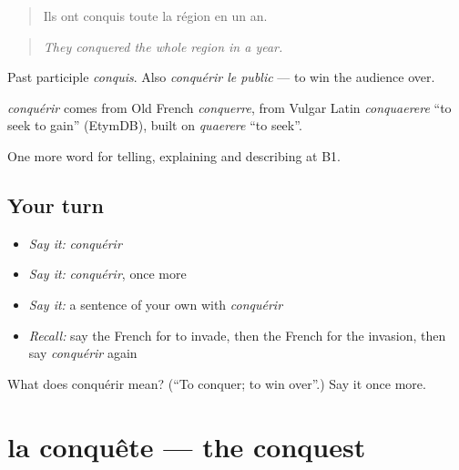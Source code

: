 \begin{quote}
Ils ont conquis toute la région en un an.
\end{quote}

\begin{quote}
\emph{They conquered the whole region in a year.}
\end{quote}

Past participle \emph{conquis}. Also \emph{conquérir le public} — to win the audience over.

\begin{cousinweb}
\emph{conquérir} comes from Old French \emph{conquerre}, from Vulgar Latin \emph{conquaerere} \textquotedblleft{}to seek to gain\textquotedblright{} (EtymDB), built on \emph{quaerere} \textquotedblleft{}to seek\textquotedblright{}.
\end{cousinweb}

\begin{grammarlens}[title={What you've built}]
One more word for telling, explaining and describing at B1.
\end{grammarlens}

\subsection*{Your turn}
\begin{itemize}
\raggedright
  \item \emph{Say it:} \emph{conquérir}
  \item \emph{Say it:} \emph{conquérir}, once more
  \item \emph{Say it:} a sentence of your own with \emph{conquérir}
  \item \emph{Recall:} say the French for to invade, then the French for the invasion, then say \emph{conquérir} again
\end{itemize}

\begin{tcolorbox}[breakable,colback=teal!4,colframe=teal!35!black,title={Before you move on}]
What does conquérir mean? (\textquotedblleft{}To conquer; to win over\textquotedblright{}.) Say it once more.
\end{tcolorbox}
\section[la conquête]{la conquête — the conquest}

\label{lesson:FR-C324-conquete}



